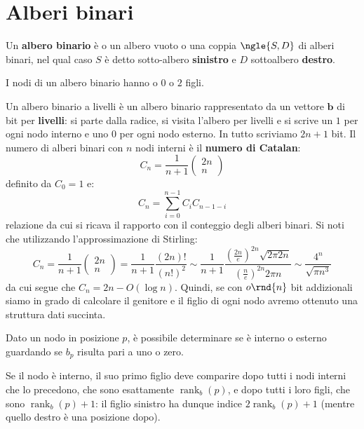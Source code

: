\documentclass[\main/main.tex]{subfiles}
\begin{document}
\section{Alberi binari}
\begin{definition}
    Un \textbf{albero binario} è o un albero vuoto o una coppia \(\ngle{S, D}\) di alberi binari, nel qual caso \(S\) è detto sotto-albero \textbf{sinistro} e \(D\) sottoalbero \textbf{destro}.
    
    I nodi di un albero binario hanno o \(0\) o \(2\) figli.
\end{definition}
\begin{definition}
    Un albero binario a livelli è un albero binario rappresentato da un vettore \(\bm{b}\) di bit per \textbf{livelli}: si parte dalla radice, si visita l'albero per livelli e si scrive un \(1\) per ogni nodo interno e uno \(0\) per ogni nodo esterno. In tutto scriviamo \(2n +1\) bit. Il numero di alberi binari con \(n\) nodi interni è il \textbf{numero di Catalan}:
    \[
        C_{n}=\frac{1}{n+1}\left(\begin{array}{l}{2 n} \\ {n}\end{array}\right)
    \]
    definito da \(C_0 = 1\) e:
    \[
        C_{n}=\sum_{i=0}^{n-1} C_{i} C_{n-1-i}
    \]
    relazione da cui si ricava il rapporto con il conteggio degli alberi binari. Si noti che utilizzando l'approssimazione di Stirling:
    \[
        C_{n}=\frac{1}{n+1}\left(\begin{array}{l}{2 n} \\ {n}\end{array}\right)=\frac{1}{n+1} \frac{(2 n) !}{(n !)^{2}} \sim \frac{1}{n+1} \frac{\left(\frac{2 n}{e}\right)^{2 n} \sqrt{2 \pi 2 n}}{\left(\frac{n}{e}\right)^{2 n} 2 \pi n} \sim \frac{4^{n}}{\sqrt{\pi n^{3}}}
    \]
    da cui segue che \(C_{n}=2 n-O(\log n)\). Quindi, se con \(o\rnd{n}\) bit addizionali siamo in grado di calcolare il genitore e il figlio di ogni nodo avremo ottenuto una struttura dati succinta.
    
    Dato un nodo in posizione \(p\), è possibile determinare se è interno o esterno guardando se \(b_p\) risulta pari a uno o zero.
    
    Se il nodo è interno, il suo primo figlio deve comparire dopo tutti i nodi interni che lo precedono, che sono esattamente \(\operatorname{rank}_{b}(p)\), e dopo tutti i loro figli, che sono \(\operatorname{rank}_{b}(p)+1\): il figlio sinistro ha dunque indice \(2 \operatorname{rank}_{b}(p)+1\) (mentre quello destro è una posizione dopo).
    

\end{definition}
\end{document}
